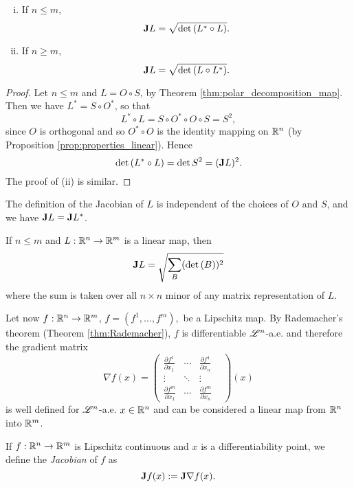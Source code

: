 \begin{theorem} \hfill
\begin{enumerate}[i)]
\item If $n \le m$, $${\bf J} L = \sqrt{\det{(L^{*} \circ L)}}.$$
\item If $n \ge m$, $${\bf J} L = \sqrt{\det{(L \circ L^{*})}}.$$
\end{enumerate}
\end{theorem}
\begin{proof}
Let $n \le m$ and $L = O \circ S$, by Theorem \ref{thm:polar_decomposition_map}. Then we have $L^{*} = S \circ O^{*}$, so that $$L^{*} \circ L = S \circ O^{*} \circ O \circ S = S^{2},$$ since $O$ is orthogonal and so $O^{*} \circ O$ is the identity mapping on $\mathbb{R}^{n}$ (by Proposition \ref{prop:properties_linear}). Hence $$\det{(L^{*} \circ L)} = \det{S^{2}} = ({\bf J} L)^{2}.$$
The proof of (ii) is similar.
\end{proof}

\begin{remark}
The definition of the Jacobian of $L$ is independent of the choices of $O$ and $S$, and we have ${\bf J} L = {\bf J} L^{*}$.
\end{remark}

\begin{proposition} \label{Cauchy_Binet}
If $n \le m$ and $L: \mathbb{R}^{n} \to \mathbb{R}^{m}$ is a linear map, then
\begin{equation*}
{\bf J} L = \sqrt{ \sum_{B} (\det{(B)})^{2}}
\end{equation*}
where the sum is taken over all $n\times n$ minor of any matrix representation of $L$.
\end{proposition}

Let now $f : \mathbb{R}^{n} \to \mathbb{R}^{m}$, $f = (f^{1}, \dots, f^{m}),$ be a Lipschitz map. By Rademacher's theorem (Theorem \ref{thm:Rademacher}), $f$ is differentiable $\mathscr{L}^{n}$-a.e. and therefore the gradient matrix 
\[\nabla f(x) = \begin{pmatrix} \frac{\partial f^{1}}{\partial x_{1}} & \cdots & \frac{\partial f^{1}}{\partial x_{n}} & \\ \vdots & \ddots & \vdots \\  \frac{\partial f^{m}}{\partial x_{1}} & \cdots & \frac{\partial f^{m}}{\partial x_{n}} & \end{pmatrix}(x)\]
is well defined for $\mathscr{L}^{n}$-a.e. $x \in \mathbb{R}^{n}$ and can be considered a linear map from $\mathbb{R}^{n}$ into $\mathbb{R}^{m}$.

\begin{definition}
If $f : \mathbb{R}^{n} \to \mathbb{R}^{m}$ is Lipschitz continuous and $x$ is a differentiability point, we define the {\em Jacobian} of $f$ as $${\bf J} f(x) := {\bf J} \nabla f(x).$$
\end{definition}


